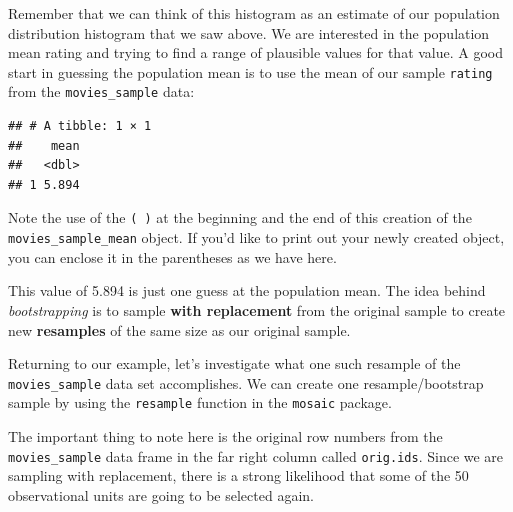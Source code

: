 \documentclass[]{tufte-book}
\newenvironment{Shaded}{\begin{snugshade}}{\end{snugshade}}
\newcommand{\KeywordTok}[1]{\textcolor[rgb]{0.13,0.29,0.53}{\textbf{{#1}}}}
\newcommand{\DataTypeTok}[1]{\textcolor[rgb]{0.13,0.29,0.53}{{#1}}}
\newcommand{\StringTok}[1]{\textcolor[rgb]{0.31,0.60,0.02}{{#1}}}
\newcommand{\NormalTok}[1]{{#1}}
\begin{document}
Remember that we can think of this histogram as an estimate of our
population distribution histogram that we saw above. We are interested
in the population mean rating and trying to find a range of plausible
values for that value. A good start in guessing the population mean is
to use the mean of our sample \texttt{rating} from the
\texttt{movies\_sample} data:

\begin{Shaded}
\end{Shaded}

\begin{verbatim}
## # A tibble: 1 × 1
##    mean
##   <dbl>
## 1 5.894
\end{verbatim}

Note the use of the \texttt{(\ )} at the beginning and the end of this
creation of the \texttt{movies\_sample\_mean} object. If you'd like to
print out your newly created object, you can enclose it in the
parentheses as we have here.

This value of 5.894 is just one guess at the population mean. The idea
behind \emph{bootstrapping} is to sample \textbf{with replacement} from
the original sample to create new \textbf{resamples} of the same size as
our original sample.

Returning to our example, let's investigate what one such resample of
the \texttt{movies\_sample} data set accomplishes. We can create one
resample/bootstrap sample by using the \texttt{resample} function in the
\texttt{mosaic} package.

\begin{Shaded}
\end{Shaded}

The important thing to note here is the original row numbers from the
\texttt{movies\_sample} data frame in the far right column called
\texttt{orig.ids}. Since we are sampling with replacement, there is a
strong likelihood that some of the 50 observational units are going to
be selected again.
\end{document}
